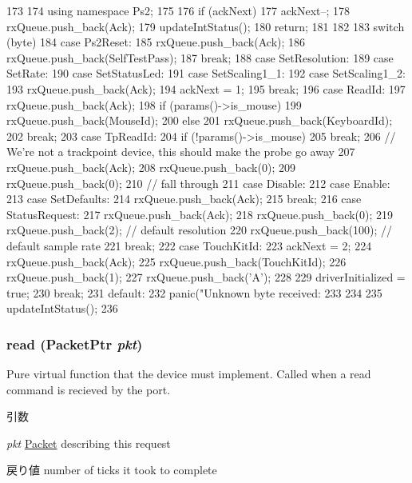 \begin{DoxyCode}
173 {
174     using namespace Ps2;
175 
176     if (ackNext) {
177         ackNext--;
178         rxQueue.push_back(Ack);
179         updateIntStatus();
180         return;
181     }
182 
183     switch (byte) {
184       case Ps2Reset:
185         rxQueue.push_back(Ack);
186         rxQueue.push_back(SelfTestPass);
187         break;
188       case SetResolution:
189       case SetRate:
190       case SetStatusLed:
191       case SetScaling1_1:
192       case SetScaling1_2:
193         rxQueue.push_back(Ack);
194         ackNext = 1;
195         break;
196       case ReadId:
197         rxQueue.push_back(Ack);
198         if (params()->is_mouse)
199             rxQueue.push_back(MouseId);
200         else
201             rxQueue.push_back(KeyboardId);
202         break;
203       case TpReadId:
204         if (!params()->is_mouse)
205             break;
206         // We're not a trackpoint device, this should make the probe go away
207         rxQueue.push_back(Ack);
208         rxQueue.push_back(0);
209         rxQueue.push_back(0);
210         // fall through
211       case Disable:
212       case Enable:
213       case SetDefaults:
214         rxQueue.push_back(Ack);
215         break;
216       case StatusRequest:
217         rxQueue.push_back(Ack);
218         rxQueue.push_back(0);
219         rxQueue.push_back(2); // default resolution
220         rxQueue.push_back(100); // default sample rate
221         break;
222       case TouchKitId:
223         ackNext = 2;
224         rxQueue.push_back(Ack);
225         rxQueue.push_back(TouchKitId);
226         rxQueue.push_back(1);
227         rxQueue.push_back('A');
228 
229         driverInitialized = true;
230         break;
231       default:
232         panic("Unknown byte received: %
233     }
234 
235     updateIntStatus();
236 }
\end{DoxyCode}
\hypertarget{classPl050_a613ec7d5e1ec64f8d21fec78ae8e568e}{
\subsubsection[{read}]{ read ({\bf PacketPtr} {\em pkt})}}
\label{classPl050_a613ec7d5e1ec64f8d21fec78ae8e568e}
Pure virtual function that the device must implement. Called when a read command is recieved by the port. 
\begin{DoxyParams}{引数}
\item[{\em pkt}]\hyperlink{classPacket}{Packet} describing this request \end{DoxyParams}
\begin{DoxyReturn}{戻り値}
number of ticks it took to complete 
\end{DoxyReturn}


